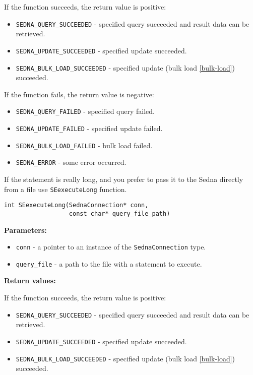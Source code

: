 \documentclass[a4paper,12pt]{article}
\newenvironment{citemize}
{\begin{itemize}
  \setlength{\itemsep}{0pt}
  \setlength{\parskip}{0pt}
  \setlength{\parsep}{0pt}}
{\end{itemize}}
\begin{document}
\noindent
If the function succeeds, the return value is positive:

\begin{citemize}
\item\verb!SEDNA_QUERY_SUCCEEDED! - specified query succeeded and result data
can be retrieved.
\item\verb!SEDNA_UPDATE_SUCCEEDED! - specified update succeeded.
\item\verb!SEDNA_BULK_LOAD_SUCCEEDED! - specified update (bulk load
\ref{bulk-load}) succeeded.
\end{citemize}

\noindent
If the function fails, the return value is negative:

\begin{citemize}
\item\verb!SEDNA_QUERY_FAILED! - specified query failed.
\item\verb!SEDNA_UPDATE_FAILED! - specified update failed.
\item\verb!SEDNA_BULK_LOAD_FAILED! - bulk load failed.
\item\verb!SEDNA_ERROR! - some error occurred.
\end{citemize}

If the statement is really long, and you prefer to pass it to the Sedna directly
from a file use \verb!SEexecuteLong! function.

\begin{verbatim}
int SEexecuteLong(SednaConnection* conn,
                  const char* query_file_path)
\end{verbatim}

\noindent
\textbf{Parameters:}

\begin{citemize}
\item\verb!conn! - a pointer to an instance of the \verb!SednaConnection! type.
\item\verb!query_file! - a path to the file with a statement to execute.
\end{citemize}

\noindent
\textbf{Return values:}

\medskip

\noindent
If the function succeeds, the return value is positive:

\begin{citemize}
\item\verb!SEDNA_QUERY_SUCCEEDED! - specified query succeeded and result data
can be retrieved.
\item\verb!SEDNA_UPDATE_SUCCEEDED! - specified update succeeded.
\item\verb!SEDNA_BULK_LOAD_SUCCEEDED! - specified update (bulk load
\ref{bulk-load}) succeeded.
\end{citemize}
\end{document}
